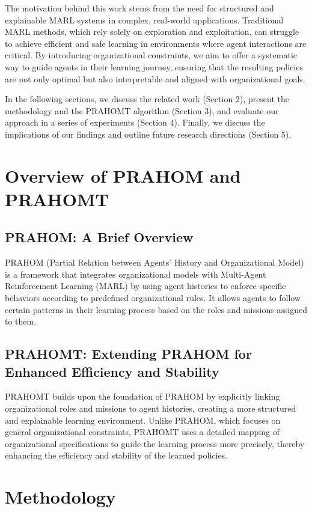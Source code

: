 \documentclass[sigconf,anonymous]{aamas}
\begin{document}
The motivation behind this work stems from the need for structured and explainable MARL systems in complex, real-world applications. Traditional MARL methods, which rely solely on exploration and exploitation, can struggle to achieve efficient and safe learning in environments where agent interactions are critical. By introducing organizational constraints, we aim to offer a systematic way to guide agents in their learning journey, ensuring that the resulting policies are not only optimal but also interpretable and aligned with organizational goals.

In the following sections, we discuss the related work (Section 2), present the methodology and the PRAHOMT algorithm (Section 3), and evaluate our approach in a series of experiments (Section 4). Finally, we discuss the implications of our findings and outline future research directions (Section 5).


\section{Overview of PRAHOM and PRAHOMT}
\label{sec:prahom_overview}

\subsection{PRAHOM: A Brief Overview}
PRAHOM (Partial Relation between Agents' History and Organizational Model) is a framework that integrates organizational models with Multi-Agent Reinforcement Learning (MARL) by using agent histories to enforce specific behaviors according to predefined organizational rules. It allows agents to follow certain patterns in their learning process based on the roles and missions assigned to them.

\subsection{PRAHOMT: Extending PRAHOM for Enhanced Efficiency and Stability}
PRAHOMT builds upon the foundation of PRAHOM by explicitly linking organizational roles and missions to agent histories, creating a more structured and explainable learning environment. Unlike PRAHOM, which focuses on general organizational constraints, PRAHOMT uses a detailed mapping of organizational specifications to guide the learning process more precisely, thereby enhancing the efficiency and stability of the learned policies.


\section{Methodology}
\label{sec:methodology}
\end{document}
